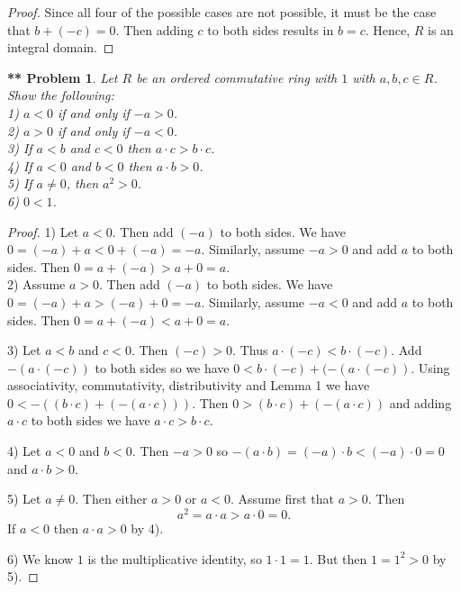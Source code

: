 \documentclass{article}
\newtheorem{**}{** Problem}
\begin{document}
\begin{flushleft}
\begin{proof}
Since all four of the possible cases are not possible, it must be the case that $b + (-c) = 0$. Then adding $c$ to both sides results in $b = c$. Hence, $R$ is an integral domain.
\end{proof}

\begin{**}
Let $R$ be an ordered commutative ring with $1$ with $a,b,c \in R$. Show the following:\\
1) $a < 0$ if and only if $-a > 0$.\\
2) $a > 0$ if and only if $-a < 0$.\\
3) If $a < b$ and $c < 0$ then $a \cdot c > b \cdot c$.\\
4) If $a < 0$ and $b < 0$ then $a \cdot b > 0$.\\
5) If $a \neq 0$, then $a^2 > 0$.\\
6) $0<1$.
\end{**}
\begin{proof}
1) Let $a < 0$. Then add $(-a)$ to both sides. We have $0 = (-a) + a < 0 + (-a) = -a$. Similarly, assume $-a > 0$ and add $a$ to both sides. Then $0 = a + (-a) > a + 0 = a$.\\

2) Assume $a > 0$. Then add $(-a)$ to both sides. We have $0 = (-a) + a > (-a) + 0 = -a$. Similarly, assume $-a < 0$ and add $a$ to both sides. Then $0 = a + (-a) < a + 0 = a$.\newline

3) Let $a < b$ and $c < 0$. Then $(-c) > 0$. Thus $a \cdot (-c) < b \cdot (-c)$. Add $-(a \cdot (-c))$ to both sides so we have $0 < b \cdot (-c) + (-(a \cdot (-c))$. Using associativity, commutativity, distributivity and Lemma 1 we have $0 < -((b \cdot c) + (-(a \cdot c)))$. Then $0 > (b \cdot c) + (-(a \cdot c))$ and adding $a \cdot c$ to both sides we have $a \cdot c > b \cdot c$.\newline

4) Let $a < 0$ and $b < 0$. Then $-a > 0$ so $-(a \cdot b) = (-a) \cdot b < (-a) \cdot 0 = 0$ and $a \cdot b > 0$.\newline

5) Let $a \neq 0$. Then either $a > 0$ or $a < 0$. Assume first that $a > 0$. Then
\[
a^2 = a \cdot a > a \cdot 0 = 0.
\]
If $a < 0$ then $a \cdot a > 0$ by 4).\newline

6) We know $1$ is the multiplicative identity, so $1 \cdot 1 = 1$. But then $1 = 1^2 > 0$ by 5).
\end{proof}


\end{flushleft}
\end{document}
